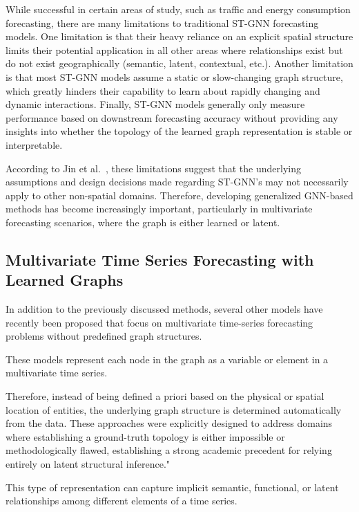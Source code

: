 While successful in certain areas of study, such as traffic and energy consumption forecasting, there are many limitations to traditional ST-GNN forecasting models. One limitation is that their heavy reliance on an explicit spatial structure limits their potential application in all other areas where relationships exist but do not exist geographically (semantic, latent, contextual, etc.). Another limitation is that most ST-GNN models assume a static or slow-changing graph structure, which greatly hinders their capability to learn about rapidly changing and dynamic interactions. Finally, ST-GNN models generally only measure performance based on downstream forecasting accuracy without providing any insights into whether the topology of the learned graph representation is stable or interpretable.

According to Jin et al.~\parencite{jin2024survey}, these limitations suggest that the underlying assumptions and design decisions made regarding ST-GNN’s may not necessarily apply to other non-spatial domains. Therefore, developing generalized GNN-based methods has become increasingly important, particularly in multivariate forecasting scenarios, where the graph is either learned or latent.

\subsection{Multivariate Time Series Forecasting with Learned Graphs} \label{sec:mts_learned_graphs}

In addition to the previously discussed methods, several other models have recently been proposed that focus on multivariate time-series forecasting problems without predefined graph structures. 

These models represent each node in the graph as a variable or element in a multivariate time series. 

Therefore, instead of being defined a priori based on the physical or spatial location of entities, the underlying graph structure is determined automatically from the data. These approaches were explicitly designed to address domains where establishing a ground-truth topology is either impossible or methodologically flawed, establishing a strong academic precedent for relying entirely on latent structural inference."

This type of representation can capture implicit semantic, functional, or latent relationships among different elements of a time series.

